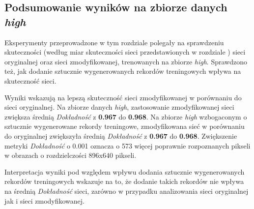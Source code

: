 \subsection{Podsumowanie wyników na zbiorze danych \textit{high}}
Eksperymenty przeprowadzone w tym rozdziale polegały na sprawdzeniu skuteczności (według miar skuteczności sieci przedstawionych w rozdziale ) sieci oryginalnej oraz sieci zmodyfikowanej, trenowanych na zbiorze \textit{high}.
Sprawdzono też, jak dodanie sztucznie wygenerowanych rekordów treningowych wpływa na skuteczność sieci.


Wyniki wskazują na lepszą skuteczność sieci zmodyfikowanej w porównaniu do sieci oryginalnej.
Na zbiorze danych \textit{high}, zastosowanie zmodyfikowanej sieci zwiększa średnią \textit{Dokładność} z \textbf{0.967} do \textbf{0.968}.
Na zbiorze \textit{high} wzbogaconym o sztucznie wygenerowane rekordy treningowe, zmodyfikowana sieć w porównaniu do oryginalnej zwiększyła średnią \textit{Dokładność} z \textbf{0.967} do \textbf{0.968}.
Zwiększenie metryki \textit{Dokładność} o 0.001 oznacza o 573 więcej poprawnie rozpoznanych pikseli w obrazach o rozdzielczości 896x640 pikseli.


Interpretacja wyniki pod względem wpływu dodania sztucznie wygenerowanych rekordów treningowych wskazuje na to, że dodanie takich rekordów nie wpływa na średnią \textit{Dokładność} sieci, zarówno w przypadku analizowania sieci oryginalnej jak i sieci zmodyfikowanej.
